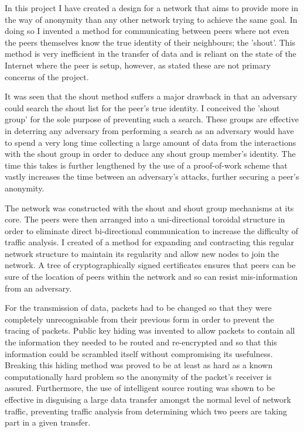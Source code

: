 \documentclass[ %
                    author={Luke Murray},
                supervisor={Dr. Simon Hollis},
                     title={Shadow Peer-to-Peer Networks},
                  subtitle={},
                    degree={MEng},
                      year={2013} ]{thesis}
\begin{document}
In this project I have created a design for a network that aims to provide more in the way of anonymity than any other network trying to achieve the same goal. In doing so I invented a method for communicating between peers where not even the peers themselves know the true identity of their neighbours; the 'shout'. This method is very inefficient in the transfer of data and is reliant on the state of the Internet where the peer is setup, however, as stated these are not primary concerns of the project.

It was seen that the shout method suffers a major drawback in that an adversary could search the shout list for the peer's true identity. I conceived the 'shout group' for the sole purpose of preventing such a search. These groups are effective in deterring any adversary from performing a search as an adversary would have to spend a very long time collecting a large amount of data from the interactions with the shout group in order to deduce any shout group member's identity. The time this takes is further lengthened by the use of a proof-of-work scheme that vastly increases the time between an adversary's attacks, further securing a peer's anonymity.

The network was constructed with the shout and shout group mechanisms at its core. The peers were then arranged into a uni-directional toroidal structure in order to eliminate direct bi-directional communication to increase the difficulty of traffic analysis. I created of a method for expanding and contracting this regular network structure to maintain its regularity and allow new nodes to join the network. A tree of cryptographically signed certificates ensures that peers can be sure of the location of peers within the network and so can resist mis-information from an adversary. 

For the transmission of data, packets had to be changed so that they were completely unrecognisable from their previous form in order to prevent the tracing of packets. Public key hiding was invented to allow packets to contain all the information they needed to be routed and re-encrypted and so that this information could be scrambled itself without compromising its usefulness. Breaking this hiding method was proved to be at least as hard as a known computationally hard problem so the anonymity of the packet's receiver is assured. Furthermore, the use of intelligent source routing was shown to be effective in disguising a large data transfer amongst the normal level of network traffic, preventing traffic analysis from determining which two peers are taking part in a given transfer.
\end{document}
